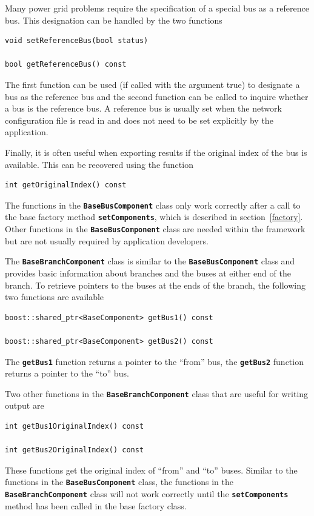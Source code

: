 Many power grid problems require the specification of a special bus as a reference bus. This designation can be handled by the two functions

{
\color{red}
\begin{Verbatim}[fontseries=b]
void setReferenceBus(bool status)

bool getReferenceBus() const
\end{Verbatim}
}

The first function can be used (if called with the argument true) to designate a bus as the reference bus and the second function can be called to inquire whether a bus is the reference bus. A reference bus is usually set when the network configuration file is read in and does not need to be set explicitly by the application.

Finally, it is often useful when exporting results if the original index of the bus is available. This can be recovered using the function

{
\color{red}
\begin{Verbatim}[fontseries=b]
int getOriginalIndex() const
\end{Verbatim}
}

The functions in the \texttt{\textbf{BaseBusComponent}} class only work
correctly after a call to the base factory method
\texttt{\textbf{setComponents}}, which is described in section~\ref{factory}. Other functions in the \texttt{\textbf{BaseBusComponent}} class are needed within the framework but are not usually required by application developers.

The \texttt{\textbf{BaseBranchComponent}} class is similar to the \texttt{\textbf{BaseBusComponent}} class and provides basic information about branches and the buses at either end of the branch. To retrieve pointers to the buses at the ends of the branch, the following two functions are available

{
\color{red}
\begin{Verbatim}[fontseries=b]
boost::shared_ptr<BaseComponent> getBus1() const

boost::shared_ptr<BaseComponent> getBus2() const
\end{Verbatim}
}

The \texttt{\textbf{getBus1}} function returns a pointer to the ``from'' bus, the \texttt{\textbf{getBus2}} function returns a pointer to the ``to'' bus.

Two other functions in the \texttt{\textbf{BaseBranchComponent}} class that are useful for writing output are

{
\color{red}
\begin{Verbatim}[fontseries=b]
int getBus1OriginalIndex() const

int getBus2OriginalIndex() const
\end{Verbatim}
}

These functions get the original index of ``from'' and ``to'' buses. Similar to the functions in the \texttt{\textbf{BaseBusComponent}} class, the functions in the \texttt{\textbf{BaseBranchComponent}} class will not work correctly until the \texttt{\textbf{setComponents}} method has been called in the base factory class.
\newline
\hyperlink{topDoc}{\color{blue}{Top}}
